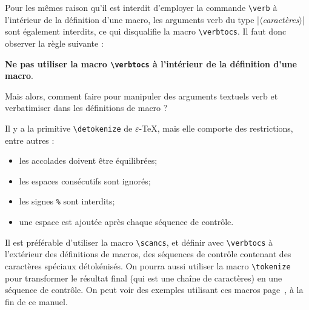 \documentclass[a4paper,10pt]{article}
\newcommand\guill[1]{\og{}#1\fg{}}
\newcommand\argu[1]{$\langle$\textit{#1}$\rangle$}
\newcommand\verbinline{\lstinline[basicstyle=\normalsize\ttfamily]}
\begin{document}
Pour les mêmes raison qu'il est interdit d'employer la commande \verb|\verb| à l'intérieur de la définition d'une macro, les arguments  verb du type |\argu{caractères}| sont également interdits, ce qui disqualifie la macro \verbinline|\verbtocs|. Il faut donc observer la règle suivante :\par\medskip
\hfill{\bfseries Ne pas utiliser la macro \verbinline-\verbtocs- à l'intérieur de la définition d'une macro}.\hfill{}\bigskip

Mais alors, comment faire pour manipuler des arguments textuels verb et \guill{verbatimiser} dans les définitions de macro ?\bigskip

Il y a la primitive \verb|\detokenize| de $\varepsilon$-\TeX, mais elle comporte des restrictions, entre autres :

\nobreak
\begin{itemize}
	\item les accolades doivent être équilibrées;
	\item les espaces consécutifs sont ignorés;
	\item les signes \verb|%| sont interdits;
	\item une espace est ajoutée après chaque séquence de contrôle.
\end{itemize}
\medskip

Il est préférable d'utiliser la macro \verbinline|\scancs|, et définir avec \verbinline|\verbtocs| à l'extérieur des définitions de macros, des séquences de contrôle contenant des caractères spéciaux détokénisés. On pourra aussi utiliser la macro \verbinline|\tokenize| pour transformer le résultat final (qui est une chaîne de caractères) en une séquence de contrôle. On peut voir des exemples utilisant ces macros page~\pageref{exemples}, à la fin de ce manuel.\medskip
\end{document}
